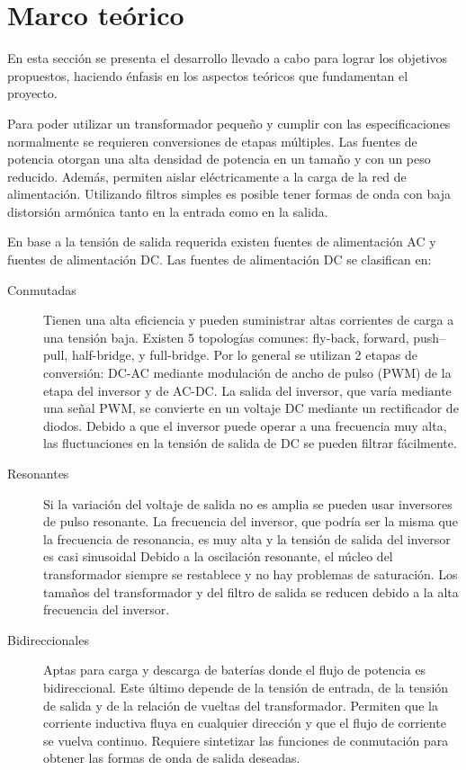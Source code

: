 \section{Marco teórico}

En esta sección se presenta el desarrollo llevado a cabo para lograr los objetivos propuestos, haciendo énfasis en los aspectos teóricos que fundamentan el proyecto.

Para poder utilizar un transformador pequeño y cumplir con las especificaciones normalmente se requieren conversiones de etapas múltiples.
Las fuentes de potencia otorgan una alta densidad de potencia en un tamaño y con un peso reducido.  
Además, permiten aislar eléctricamente a la carga de la red de alimentación. 
Utilizando filtros simples es posible tener formas de onda con baja distorsión armónica tanto en la entrada como en la salida. 

En base a la tensión de salida requerida existen fuentes de alimentación AC y fuentes de alimentación DC.
Las fuentes de alimentación DC se clasifican en:
\begin{description}
    \item[Conmutadas]
    Tienen una alta eficiencia y pueden suministrar altas corrientes de carga a una tensión baja.
    Existen 5 topologías comunes: fly-back, forward, push–pull, half-bridge, y full-bridge.
    Por lo general se utilizan 2 etapas de conversión: DC-AC mediante modulación de ancho de pulso (PWM) de la etapa del inversor y de AC-DC.
    La salida del inversor, que varía mediante una señal PWM, se convierte en un voltaje DC mediante un rectificador de diodos. 
    Debido a que el inversor puede operar a una frecuencia muy alta, las fluctuaciones en la tensión de salida de DC se pueden filtrar fácilmente.
    \item[Resonantes]
    Si la variación del voltaje de salida no es amplia se pueden usar inversores de pulso resonante. 
    La frecuencia del inversor, que podría ser la misma que la frecuencia de resonancia, es muy alta y la tensión de salida del inversor es casi sinusoidal 
    Debido a la oscilación resonante, el núcleo del transformador siempre se restablece y no hay problemas de saturación. 
    Los tamaños del transformador y del filtro de salida se reducen debido a la alta frecuencia del inversor.
    \item[Bidireccionales]
    Aptas para carga y descarga de baterías donde el flujo de potencia es bidireccional. 
    Este último depende de la tensión de entrada, de la tensión de salida y de la relación de vueltas del transformador. 
    Permiten que la corriente inductiva fluya en cualquier dirección y que el flujo de corriente se vuelva continuo.
    Requiere sintetizar las funciones de conmutación para obtener las formas de onda de salida deseadas.
\end{description}

